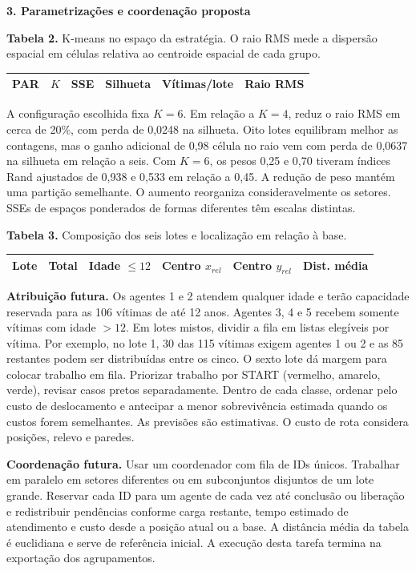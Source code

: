 \documentclass[11pt,a4paper]{article}
\newcommand{\titulo}[1]{\textbf{\textcolor{blue!45!black}{#1}}\par}
\begin{document}
\clearpage
\titulo{3. Parametrizações e coordenação proposta}

\textbf{Tabela 2.} K-means no espaço da estratégia. O raio RMS mede a dispersão espacial
em células relativa ao centroide espacial de cada grupo.
\begin{center}
\begin{tabular}{rrrrrr}
\toprule
PAR & $K$ & SSE & Silhueta & Vítimas/lote & Raio RMS \\
\midrule

\end{tabular}
\end{center}

A configuração escolhida fixa $K=6$. Em relação a $K=4$, reduz o raio RMS em cerca de 20\%,
com perda de 0,0248 na silhueta. Oito lotes equilibram melhor as contagens, mas o ganho
adicional de 0,98 célula no raio vem com perda de 0,0637 na silhueta em relação a seis.
Com $K=6$, os pesos 0,25 e 0,70 tiveram índices Rand ajustados de 0,938 e 0,533 em relação
a 0,45. A redução de peso mantém uma partição semelhante. O aumento reorganiza
consideravelmente os setores. SSEs de espaços ponderados de formas diferentes têm escalas distintas.

\textbf{Tabela 3.} Composição dos seis lotes e localização em relação à base.
\begin{center}
\begin{tabular}{rrrrrr}
\toprule
Lote & Total & Idade $\leq12$ & Centro $x_{rel}$ & Centro $y_{rel}$ & Dist. média \\
\midrule

\end{tabular}
\end{center}

\textbf{Atribuição futura.}
Os agentes 1 e 2 atendem qualquer idade e terão capacidade reservada para as 106
vítimas de até 12 anos. Agentes 3, 4 e 5 recebem somente vítimas com idade $>12$.
Em lotes mistos, dividir a fila em listas elegíveis por vítima. Por exemplo, no lote 1,
30 das 115 vítimas exigem agentes 1 ou 2 e as 85 restantes podem ser distribuídas
entre os cinco. O sexto lote dá margem para colocar trabalho em fila. Priorizar trabalho
por START (vermelho, amarelo, verde), revisar casos pretos separadamente.
Dentro de cada classe, ordenar pelo custo de deslocamento e antecipar a menor
sobrevivência estimada quando os custos forem semelhantes.
As previsões são estimativas. O custo de rota considera posições, relevo e paredes.

\textbf{Coordenação futura.}
Usar um coordenador com fila de IDs únicos. Trabalhar em paralelo em setores diferentes
ou em subconjuntos disjuntos de um lote grande. Reservar cada ID para um agente de
cada vez até conclusão ou liberação e redistribuir pendências conforme carga restante,
tempo estimado de atendimento e custo desde a posição atual ou a base.
A distância média da tabela é euclidiana e serve de referência inicial.
A execução desta tarefa termina na exportação dos agrupamentos.
\end{document}
